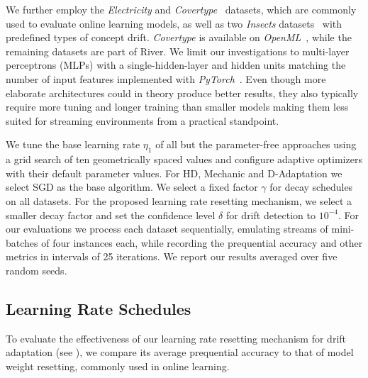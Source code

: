\documentclass{article} %
\begin{document}

We further employ the \textit{Electricity} and \textit{Covertype}~\citep{misc_covertype_31} datasets, which are commonly used to evaluate online learning models, as well as two \textit{Insects} datasets~\citep{souzaChallengesBenchmarkingStream2020} with predefined types of concept drift.
\textit{Covertype} is available on \textit{OpenML}~\citep{vanschorenOpenMLNetworkedScience2014}, while the remaining datasets are part of River.
We limit our investigations to multi-layer perceptrons (MLPs) with a single-hidden-layer and hidden units matching the number of input features implemented with \textit{PyTorch}~\citep{paszkePyTorchImperativeStyle2019}.
Even though more elaborate architectures could in theory produce better results, they also typically require more tuning and longer training than smaller models making them less suited for streaming environments from a practical standpoint.

We tune the base learning rate $\eta_1$ of all but the parameter-free approaches using a grid search of ten geometrically spaced values and configure adaptive optimizers with their default parameter values. For HD, Mechanic and D-Adaptation we select SGD as the base algorithm.
We select a fixed factor $\gamma$ for decay schedules on all datasets.
For the proposed learning rate resetting mechanism, we select a smaller decay factor and set the confidence level $\delta$ for drift detection to $10^{-4}$.
For our evaluations we process each dataset sequentially, emulating streams of mini-batches of four instances each, while recording the prequential accuracy and other metrics in intervals of 25 iterations.
We report our results averaged over five random seeds.

\subsection{Learning Rate Schedules}

To evaluate the effectiveness of our learning rate resetting mechanism for drift adaptation (see ), we compare its average prequential accuracy to that of model weight resetting, commonly used in online learning.
\end{document}
